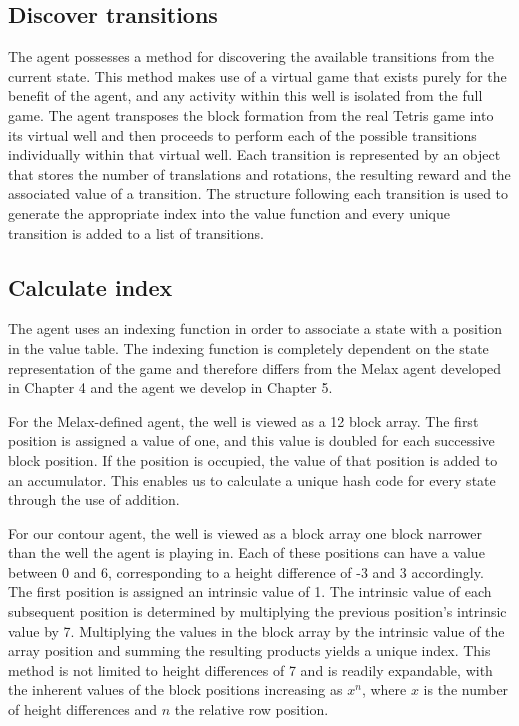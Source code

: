 \documentclass{rucsthesis}
\begin{document}
\subsection{Discover transitions}

The agent possesses a method for discovering the available transitions from the current state. This method makes use of a virtual game that exists purely for the benefit of the agent, and any activity within this well is isolated from the full game. The agent transposes the block formation from the real Tetris game into its virtual well and then proceeds to perform each of the possible transitions individually within that virtual well. Each transition is represented by an object that stores the number of translations and rotations, the resulting reward and the associated value of a transition. The structure following each transition is used to generate the appropriate index into the value function and every unique transition is added to a list of transitions.

\subsection{Calculate index}

The agent uses an indexing function in order to associate a state with a position in the value table. The indexing function is completely dependent on the state representation of the game and therefore differs from the Melax agent developed in Chapter 4 and the agent we develop in Chapter 5.

For the Melax-defined agent, the well is viewed as a 12 block array. The first position is assigned a value of one, and this value is doubled for each successive block position. If the position is occupied, the value of that position is added to an accumulator. This enables us to calculate a unique hash code for every state through the use of addition.

For our contour agent, the well is viewed as a block array one block narrower than the well the agent is playing in. Each of these positions can have a value between 0 and 6, corresponding to a height difference of -3 and 3 accordingly. The first position is assigned an intrinsic value of 1. The intrinsic value of each subsequent position is determined by multiplying the previous position's intrinsic value by 7. Multiplying the values in the block array by the intrinsic value of the array position and summing the resulting products yields a unique index. This method is not limited to height differences of 7 and is readily expandable, with the inherent values of the block positions increasing as $x^n$, where $x$ is the number of height differences and $n$ the relative row position.
\end{document}
